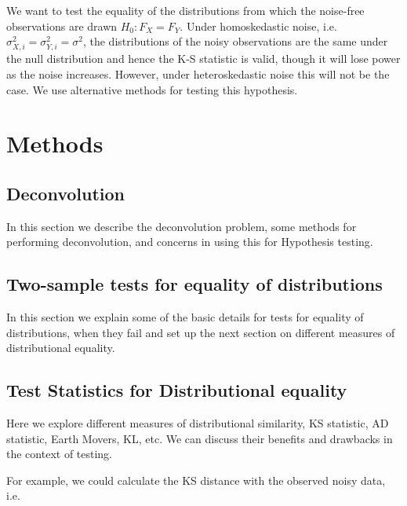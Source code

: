 \documentclass[12pt]{article}
\begin{document}
We want to test the equality of the distributions from which the noise-free observations are drawn $H_0: F_X = F_Y$. Under homoskedastic noise, i.e. $\sigma^2_{X,i} = \sigma^2_{Y,i} = \sigma^2$, the distributions of the noisy observations are the same under the null distribution and hence the K-S statistic is valid, though it will lose power as the noise increases. However, under heteroskedastic noise this will not be the case. We use alternative methods for testing this hypothesis. 



\section{Methods} %
\label{sec:methods}

\subsection{Deconvolution} %
\label{sub:deconvolution}
In this section we describe the deconvolution problem, some methods for performing deconvolution, and concerns in using this for Hypothesis testing. 

\subsection{Two-sample tests for equality of distributions} %
\label{sub:two_sample_tests_for_equality_of_distributions}

In this section we explain some of the basic details for tests for equality of distributions, when they fail and set up the next section on different measures of distributional equality. 



\subsection{Test Statistics for Distributional equality} %
\label{sub:test_statistics_for_distributional_equality}

Here we explore different measures of distributional similarity, KS statistic, AD statistic, Earth Movers, KL, etc. We can discuss their benefits and drawbacks in the context of testing. 

For example, we could calculate the KS distance with the observed noisy data, i.e. 
\end{document}
